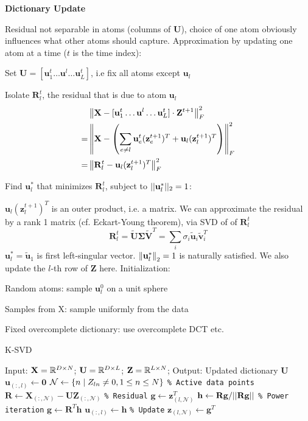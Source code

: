 \documentclass[12pt]{article}
\begin{document}
\textbf{Dictionary Update}
\par Residual not separable in atoms (columns of $\mathbf{U}$), choice of one atom obviously influences what other atoms should capture. Approximation by updating one atom at a time ($t$ is the time index):
\ulb
\item Set $\mathbf{U} = [\mathbf{u}^t_1 \dots \mathbf{u}^l \dots \mathbf{u}^t_L]$, i.e fix all atoms except $\mathbf{u}_l$
\item Isolate $\mathbf{R}_l^t$, the residual that is due to atom  $\mathbf{u}_l$
\begin{equation}
\begin{split}
& \left\lVert\mathbf{X} - [\mathbf{u}^t_1 \dots \mathbf{u}^l \dots \mathbf{u}^t_L] \cdot \mathbf{Z}^{t+1}\right\rVert^2_F \\
=& \left\lVert\mathbf{X} - \left( \sum_{e\neq l}\mathbf{u}^t_e(\mathbf{z}_e^{t+1})^T + \mathbf{u}_l (\mathbf{z}_l^{t+1})^T \right) \right\rVert^2_F \\
=& \left\lVert\mathbf{R}_l^t - \mathbf{u}_l (\mathbf{z}_l^{t+1})^T\right\rVert^2_F
\end{split}
\end{equation}
\item Find $\mathbf{u}^*_l$ that minimizes $\mathbf{R}_l^t$, subject to $||\mathbf{u}^*_l||_2 = 1$:
\par $\mathbf{u}_l (\mathbf{z}_l^{t+1})^T$ is an outer product, i.e. a matrix. We can approximate the residual by a rank 1 matrix (cf. Eckart-Young theorem), via SVD of of $\mathbf{R}_l^t$
\[ \mathbf{R}_l^t = \widetilde{\mathbf{U}}\mathbf{\Sigma}\widetilde{\mathbf{V}}^T = \sum_i \sigma_i\tilde{\mathbf{u}}_i\tilde{\mathbf{v}}_i^T \]
$\mathbf{u}_l^*  = \tilde{\mathbf{u}}_1$ is first left-singular vector. $\left\lVert\mathbf{u}_l^*\right\rVert_2 = 1$ is naturally satisfied. We also update the $l$-th row of $\mathbf{Z}$ here.
\ule
Initialization:
\ulb
\item Random atoms: sample $\mathbf{u}_l^0$ on a unit sphere
\item Samples from X: sample uniformly from the data
\item Fixed overcomplete dictionary: use overcomplete DCT etc.
\ule

\begin{algorithm*}
\caption{K-SVD}
\begin{algorithmic}[1]
\State Input: $\mathbf{X} = \mathbb{R}^{D\times N}$; $\mathbf{U} = \mathbb{R}^{D\times L}$; $\mathbf{Z} = \mathbb{R}^{L\times N}$; 
\State Output: Updated dictionary $\mathbf{U}$
\State $\mathbf{u}_{(:,l)}\gets\mathbf{0}$
\State $\mathcal{N}\gets\{ n\mid Z_{ln}\neq 0,1 \leq n \leq N \}$ \texttt{\% Active data points}
\State $\mathbf{R} \gets \mathbf{X}_{(:,\mathcal{N})} - \mathbf{UZ}_{(:,\mathcal{N})}$ \texttt{\% Residual}
\State $\mathbf{g}\gets\mathbf{z}^T_{(l,\mathcal{N})}$
\State $\mathbf{h}\gets\mathbf{Rg}/||\mathbf{Rg}||$ \texttt{\% Power iteration}
\State $\mathbf{g}\gets\mathbf{R}^T\mathbf{h}$
\State $\mathbf{u}_{(:,l)}\gets \mathbf{h}$ \texttt{\% Update}
\State $\mathbf{z}_{(l,\mathcal{N})}\gets\mathbf{g}^T$
\EndFor
\end{algorithmic}
\end{algorithm*}
\end{document}
